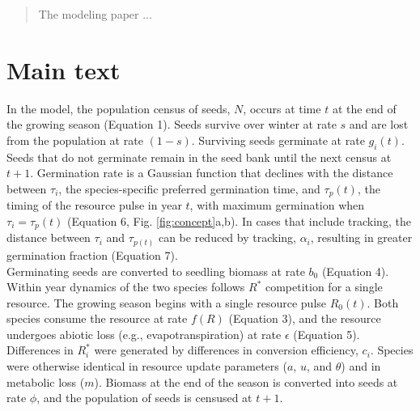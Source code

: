 \documentclass[11pt,letterpaper]{article}
\begin{document}
\begin{abstract} 
The modeling paper ... 
\end{abstract}

\newpage
\section{Main text} %




In the model, the population census of seeds, $N$, occurs at time $t$ at the end of the growing season (Equation 1).  Seeds survive over winter at rate $s$ and are lost from the population at rate $(1-s)$.  Surviving seeds germinate at rate $g_{i}(t)$.  Seeds that do not germinate remain in the seed bank until the next census at $t+1$.  Germination rate is a Gaussian function that declines with the distance between $\tau_{i}$, the species-specific preferred germination time, and $\tau_{p}(t)$, the timing of the resource pulse in year $t$, with maximum germination when $\tau_{i} = \tau_{p}(t)$ (Equation 6, Fig. \ref{fig:concept}a,b).  In cases that include tracking, the distance between $\tau_{i}$ and  $\tau_{p(t)}$ can be reduced by tracking, $\alpha_{i}$, resulting in greater germination fraction (Equation 7). \\

Germinating seeds are converted to seedling biomass at rate $b_{0}$ (Equation 4). Within year dynamics of the two species follows $R^{*}$ competition for a single resource.  The growing season begins with a single resource pulse $R_0(t)$.  Both  species consume the resource at rate $f(R)$ (Equation 3), and the resource undergoes abiotic loss (e.g., evapotranspiration) at rate $\epsilon$ (Equation 5).  Differences in $R^{*}_{i}$ were generated by differences in conversion efficiency, $c_{i}$. Species were otherwise identical in resource update parameters ($a$, $u$, and $\theta$) and in metabolic loss ($m$).  Biomass at the end of the season is converted into seeds at rate $\phi$, and the population of seeds is censused at $t+1$. \\
\end{document}
